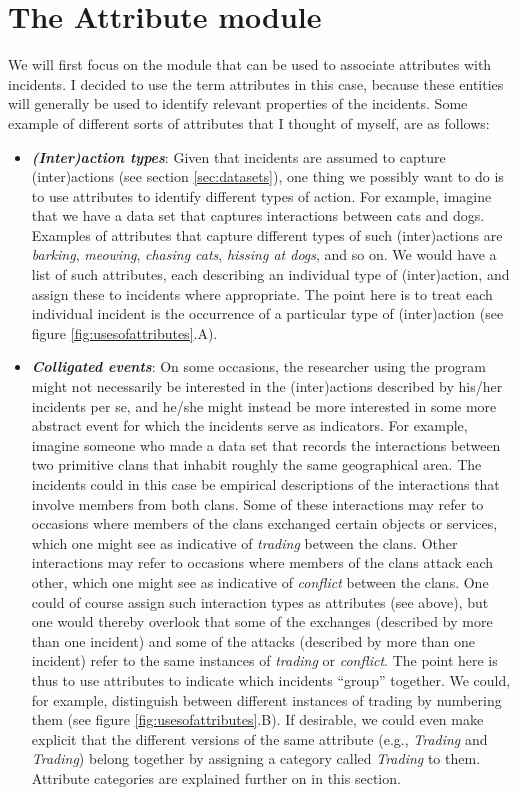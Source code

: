\documentclass{memoir}
\begin{document}
\section{The Attribute module}
\label{sec:attributemodule}

We will first focus on the module that can be used to associate attributes with incidents. I decided to use the term attributes in this case, because these entities will generally be used to identify relevant properties of the incidents. Some example of different sorts of attributes that I thought of myself, are as follows:
\begin{itemize}
\item{\emph{\textbf{(Inter)action types}}: Given that incidents are assumed to capture (inter)actions (see section \ref{sec:datasets}), one thing we possibly want to do is to use attributes to identify different types of action. For example, imagine that we have a data set that captures interactions between cats and dogs. Examples of attributes that capture different types of such (inter)actions are \emph{barking}, \emph{meowing}, \emph{chasing cats}, \emph{hissing at dogs}, and so on. We would have a list of such attributes, each describing an individual type of (inter)action, and assign these to incidents where appropriate. The point here is to treat each individual incident is the occurrence of a particular type of (inter)action (see figure \ref{fig:usesofattributes}.A).}
\item{\emph{\textbf{Colligated events}}: On some occasions, the researcher using the program might not necessarily be interested in the (inter)actions described by his/her incidents per se, and he/she might instead be more interested in some more abstract event for which the incidents serve as indicators. For example, imagine someone who made a data set that records the interactions between two primitive clans that inhabit roughly the same geographical area. The incidents could in this case be empirical descriptions of the interactions that involve members from both clans. Some of these interactions may refer to occasions where members of the clans exchanged certain objects or services, which one might see as indicative of \emph{trading} between the clans. Other interactions may refer to occasions where members of the clans attack each other, which one might see as indicative of \emph{conflict} between the clans. One could of course assign such interaction types as attributes (see above), but one would thereby overlook that some of the exchanges (described by more than one incident) and some of the attacks (described by more than one incident) refer to the same instances of \emph{trading} or \emph{conflict}. The point here is thus to use attributes to indicate which incidents ``group'' together. We could, for example, distinguish between different instances of trading by numbering them (see figure \ref{fig:usesofattributes}.B). If desirable, we could even make explicit that the different versions of the same attribute (e.g., \emph{Trading} and \emph{Trading}) belong together by assigning a category called \emph{Trading} to them. Attribute categories are explained further on in this section.}

\end{itemize}
\end{document}
